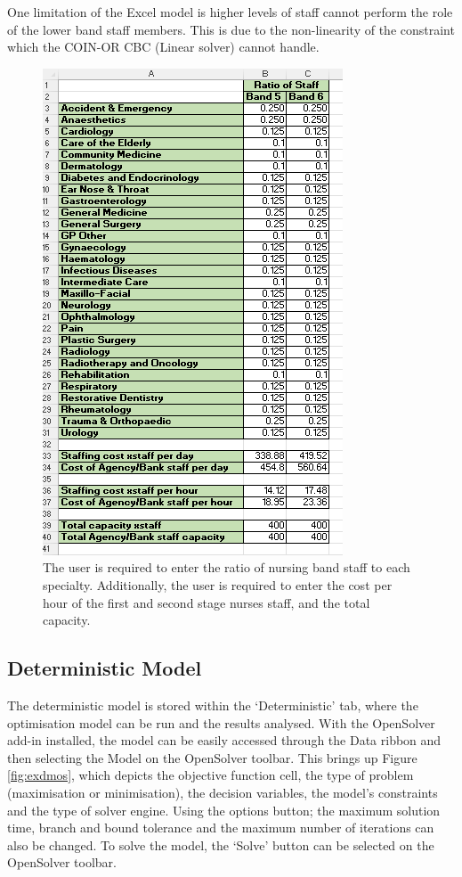\documentclass[../thesis.tex]{subfiles}
\begin{document}
One limitation of the Excel model is higher levels of staff cannot perform the role of the lower band staff members. This is due to the non-linearity of the constraint which the COIN-OR CBC (Linear solver) cannot handle.

\begin{figure}[h!]
    \centering
\includegraphics{Chapters/Chapter7/Figures/exStaff.png}
    \caption{The user is required to enter the ratio of nursing band staff to each specialty. Additionally, the user is required to enter the cost per hour of the first and second stage nurses staff, and the total capacity.}
    \label{fig:exstaff}
\end{figure}

\subsection{Deterministic Model}
The deterministic model is stored within the `Deterministic' tab, where the optimisation model can be run and the results analysed. With the OpenSolver add-in installed, the model can be easily accessed through the Data ribbon and then selecting the Model on the OpenSolver toolbar. This brings up Figure \ref{fig:exdmos}, which depicts the objective function cell, the type of problem (maximisation or minimisation), the decision variables, the model's constraints and the type of solver engine. Using the options button; the maximum solution time, branch and bound tolerance and the maximum number of iterations can also be changed. To solve the model, the `Solve' button can be selected on the OpenSolver toolbar.
\end{document}
